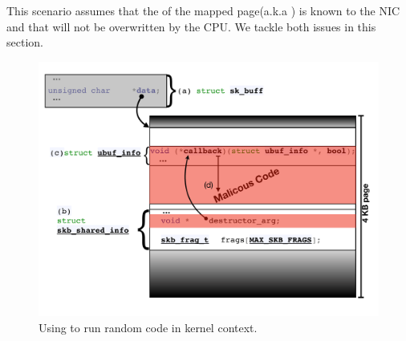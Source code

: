 This scenario assumes that the \kva of the mapped page(a.k.a \means) is known to the NIC and that \shinfo will not be overwritten by the CPU. We tackle both issues in this section.
\begin{figure}
    \centering
    \includegraphics[width=1.2\linewidth]{figs/ubuf.pdf}
    \caption{Using \shinfo to run random code in kernel context.}
    \label{fig:sh_info}
\end{figure}

